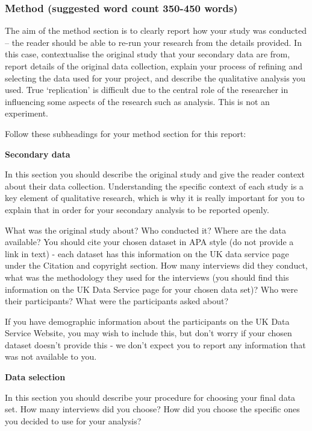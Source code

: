 \documentclass[
  english,
  letterpaper,
  DIV=11,
  numbers=noendperiod]{scrreprt}
\begin{document}
\subsubsection{Method (suggested word count 350-450
words)}\label{method-suggested-word-count-350-450-words}

The aim of the method section is to clearly report how your study was
conducted -- the reader should be able to re-run your research from the
details provided. In this case, contextualise the original study that
your secondary data are from, report details of the original data
collection, explain your process of refining and selecting the data used
for your project, and describe the qualitative analysis you used. True
`replication' is difficult due to the central role of the researcher in
influencing some aspects of the research such as analysis. This is not
an experiment.

Follow these subheadings for your method section for this report:

\textbf{Secondary data}

In this section you should describe the original study and give the
reader context about their data collection. Understanding the specific
context of each study is a key element of qualitative research, which is
why it is really important for you to explain that in order for your
secondary analysis to be reported openly.

What was the original study about? Who conducted it? Where are the data
available? You should cite your chosen dataset in APA style (do not
provide a link in text) - each dataset has this information on the UK
data service page under the Citation and copyright section. How many
interviews did they conduct, what was the methodology they used for the
interviews (you should find this information on the UK Data Service page
for your chosen data set)? Who were their participants? What were the
participants asked about?

If you have demographic information about the participants on the UK
Data Service Website, you may wish to include this, but don't worry if
your chosen dataset doesn't provide this - we don't expect you to report
any information that was not available to you.

\textbf{Data selection}

In this section you should describe your procedure for choosing your
final data set. How many interviews did you choose? How did you choose
the specific ones you decided to use for your analysis?
\end{document}
